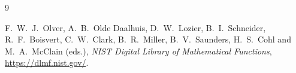 \documentclass[EJP,preprint]{ejpecp}
\begin{document}
\begin{thebibliography}{9}

F.~W.~J.~Olver, A.~B.~Olde Daalhuis, D.~W.~Lozier, B.~I.~Schneider,
R.~F.~Boisvert, C.~W.~Clark, B.~R.~Miller, B.~V.~Saunders, H.~S.~Cohl and
M.~A.~McClain (eds.), \emph{NIST Digital Library of Mathematical Functions},
\url{https://dlmf.nist.gov/}.

\end{thebibliography}
\end{document}

